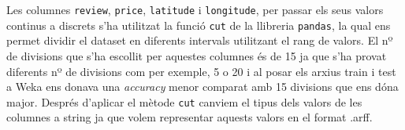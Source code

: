 \documentclass[../informe.tex]{subfiles}
\begin{document}
    \medskip
    Les columnes \texttt{review}, \texttt{price}, \texttt{latitude} i \texttt{longitude}, per passar els seus valors continus a discrets s'ha utilitzat la funció \texttt{cut} de la llibreria \texttt{pandas}, la qual ens permet dividir el dataset en diferents intervals utilitzant el rang de valors. El nº de divisions que s'ha escollit per aquestes columnes és de 15 ja que s'ha provat diferents nº de divisions com per exemple, 5 o 20 i al posar els arxius train i test a Weka ens donava una \emph{accuracy} menor comparat amb 15 divisions que ens dóna major. Després d'aplicar el mètode \texttt{cut} canviem el tipus dels valors de les columnes a string ja que volem representar aquests valors en el format .arff.
\end{document}
